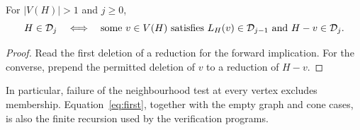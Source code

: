 \begin{lemma}\label{lem:first}
For $|V(H)|>1$ and $j\geq0$,
\begin{equation}\label{eq:first}
 H\in\mathcal D_j\quad\Longleftrightarrow\quad
 \text{some }v\in V(H)\text{ satisfies }L_H(v)\in\mathcal D_{j-1}
 \text{ and }H-v\in\mathcal D_j.
\end{equation}
\end{lemma}
\begin{proof}
Read the first deletion of a reduction for the forward implication.
For the converse, prepend the permitted deletion of $v$ to a reduction of $H-v$.
\end{proof}
In particular, failure of the neighbourhood test at every vertex excludes
membership. Equation~\eqref{eq:first}, together with the empty graph and cone
cases, is also the finite recursion used by the verification programs.
